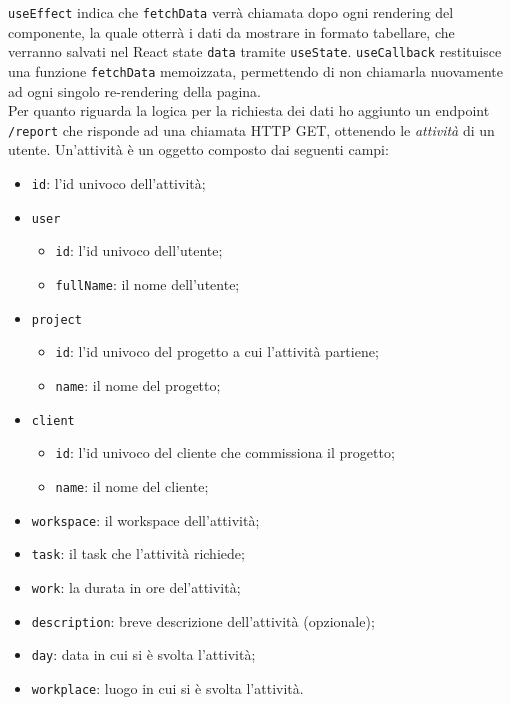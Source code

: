 \noindent \texttt{useEffect} indica che \texttt{fetchData} verrà chiamata dopo ogni rendering del componente, la quale otterrà i dati da mostrare in formato tabellare, che verranno salvati nel React state \texttt{data} tramite \texttt{useState}.
\texttt{useCallback} restituisce una funzione \texttt{fetchData} memoizzata, permettendo di non chiamarla nuovamente ad ogni singolo re-rendering della pagina.\\
Per quanto riguarda la logica per la richiesta dei dati ho aggiunto un endpoint \texttt{/report} che risponde ad una chiamata HTTP GET, ottenendo le \textit{attività} di un utente. Un'attività è un oggetto composto dai seguenti campi:
\begin{itemize}
  \item \texttt{id}: l'id univoco dell'attività;
  \item \texttt{user}
  \begin{itemize}
    \item \texttt{id}: l'id univoco dell'utente;
    \item \texttt{fullName}: il nome dell'utente;  
  \end{itemize}
  \item \texttt{project}
  \begin{itemize}
    \item \texttt{id}: l'id univoco del progetto a cui l'attività partiene;
    \item \texttt{name}: il nome del progetto;
  \end{itemize}
  \item \texttt{client}
  \begin{itemize}
    \item \texttt{id}: l'id univoco del cliente che commissiona il progetto;
    \item \texttt{name}: il nome del cliente;
  \end{itemize}
  \item \texttt{workspace}: il workspace dell'attività;
  \item \texttt{task}: il task che l'attività richiede;
  \item \texttt{work}: la durata in ore del'attività;
  \item \texttt{description}: breve descrizione dell'attività (opzionale);
  \item \texttt{day}: data in cui si è svolta l'attività;
  \item \texttt{workplace}: luogo in cui si è svolta l'attività.
\end{itemize}

